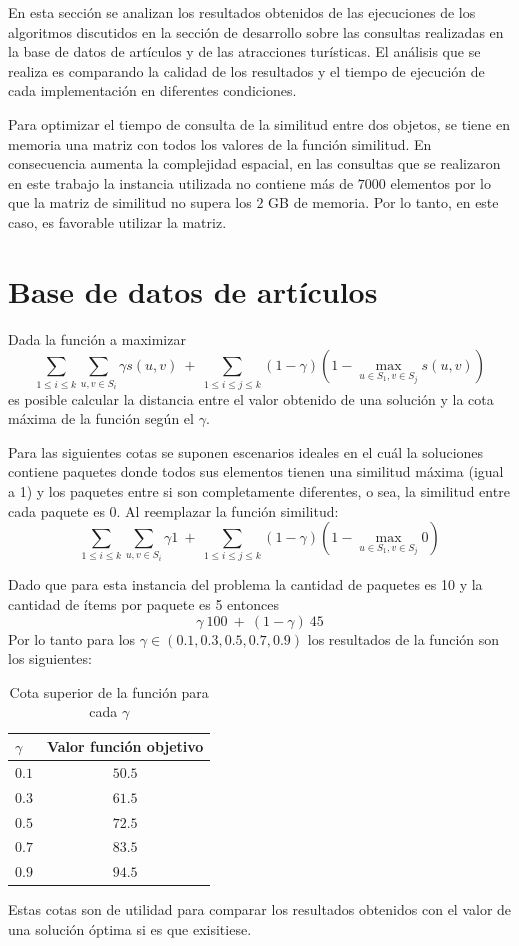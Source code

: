 En esta sección se analizan los resultados obtenidos de las ejecuciones de los algoritmos discutidos en la sección de desarrollo sobre las consultas realizadas en la base de datos de artículos y de las atracciones turísticas. El análisis que se realiza es comparando la calidad de los resultados y el tiempo de ejecución de cada implementación en diferentes condiciones.

Para optimizar el tiempo de consulta de la similitud entre dos objetos, se tiene en memoria una matriz con todos los valores de la función similitud. En consecuencia aumenta la complejidad espacial, en las consultas que se realizaron en este trabajo la instancia utilizada no contiene más de $7000$ elementos por lo que la matriz de similitud no supera los $2$ GB de memoria. Por lo tanto, en este caso, es favorable utilizar la matriz.
\section{Base de datos de artículos}
Dada la función a maximizar $$\displaystyle\sum_{1 \leq i \leq k} \displaystyle\sum_{u,v \in S_{i}} \gamma s(u,v)\ +\ \displaystyle\sum_{1 \leq i \leq j \leq k} (1-\gamma) (1 - \displaystyle\max_{u \in S_{1}, v \in S_{j}} s(u,v))$$ es posible calcular la distancia entre el valor obtenido de una solución y la cota máxima de la función según el $\gamma$.

Para las siguientes cotas se suponen escenarios ideales en el cuál la soluciones contiene paquetes donde todos sus elementos tienen una similitud máxima (igual a 1) y los paquetes entre si son completamente diferentes, o sea, la similitud entre cada paquete es 0. Al reemplazar la función similitud:
$$\displaystyle\sum_{1 \leq i \leq k} \displaystyle\sum_{u,v \in S_{i}} \gamma 1\ +\ \displaystyle\sum_{1 \leq i \leq j \leq k} (1-\gamma) (1 - \displaystyle\max_{u \in S_{1}, v \in S_{j}} 0)$$ 

Dado que para esta instancia del problema la cantidad de paquetes es 10 y la cantidad de ítems por paquete es 5 entonces  $$\displaystyle\gamma\ 100\ +\ (1-\gamma)\ 45$$
Por lo tanto para los $\gamma \in (0.1, 0.3, 0.5, 0.7, 0.9)$ los resultados de la función son los siguientes:
\begin{table}[H]
  \centering
  \resizebox{0.5\textwidth}{!} {
    \begin{tabular}{|lc|}
    \hline
    $\gamma$ & Valor función objetivo \\
    \hline
    $0.1$  & $50.5$ \\
    $0.3$  & $61.5$ \\
    $0.5$  & $72.5$ \\
    $0.7$  & $83.5$ \\
    $0.9$  & $94.5$ \\
    \hline
    \end{tabular}
  }
    \caption {Cota superior de la función para cada $\gamma$}
\end{table}
Estas cotas son de utilidad para comparar los resultados obtenidos con el valor de una solución óptima si es que exisitiese.

